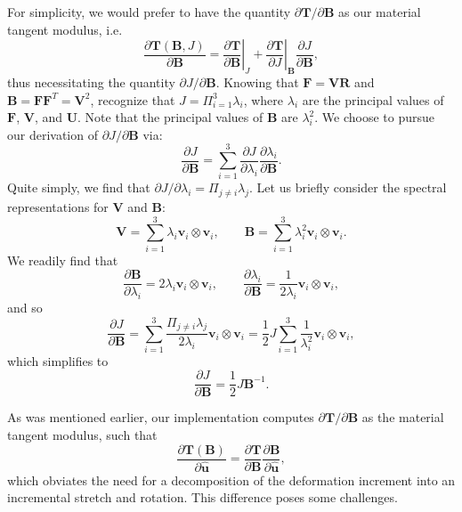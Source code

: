 \documentclass[11pt]{article} %
\begin{document}
For simplicity, we would prefer to have the quantity ${\partial \mathbf{T}}/{\partial {\mathbf{B}}}$ as our material tangent modulus, i.e.
\begin{equation}
	\frac{\partial \mathbf{T} (\mathbf{B}, J)}{\partial {\mathbf{B}}} = \left. \frac{\partial \mathbf{T}}{\partial {\mathbf{B}}} \right|_{J} + \left. \frac{\partial \mathbf{T}}{\partial {J}} \right|_{\mathbf{B}} \frac{\partial {J}}{\partial {\mathbf{B}}},
\end{equation}
thus necessitating the quantity ${\partial {J}}/{\partial {\mathbf{B}}}$. Knowing that $\mathbf{F} = \mathbf{V} \mathbf{R}$ and $\mathbf{B} = \mathbf{F} \mathbf{F}^T = \mathbf{V}^2$, recognize that $J = \Pi_{i = 1}^{3} \lambda_i$, where $\lambda_i$ are the principal values of $\mathbf{F}$, $\mathbf{V}$, and $\mathbf{U}$. Note that the principal values of $\mathbf{B}$ are $\lambda_i^2$. We choose to pursue our derivation of ${\partial {J}}/{\partial {\mathbf{B}}}$ via:
\begin{equation}
	\frac{\partial {J}}{\partial {\mathbf{B}}} = \sum_{i = 1}^{3} \frac{\partial {J}}{\partial \lambda_i} \frac{\partial \lambda_i}{\partial {\mathbf{B}}}.
\end{equation}
Quite simply, we find that $\partial J / \partial \lambda_i = \Pi_{j \neq i} \lambda_j$. Let us briefly consider the spectral representations for $\mathbf{V}$ and $\mathbf{B}$:
\begin{equation}
	\mathbf{V} = \sum_{i = 1}^{3} \lambda_i \mathbf{v}_i \otimes \mathbf{v}_i, \qquad \mathbf{B} = \sum_{i = 1}^{3} \lambda^2_i \mathbf{v}_i \otimes \mathbf{v}_i.
\end{equation}
We readily find that
\begin{equation}
	\frac{\partial \mathbf{B}}{\partial \lambda_i} = 2 \lambda_i \mathbf{v}_i \otimes \mathbf{v}_i, \qquad \frac{\partial \lambda_i}{\partial \mathbf{B}} = \frac{1}{2 \lambda_i} \mathbf{v}_i \otimes \mathbf{v}_i,
\end{equation}
and so
\begin{equation}
	\frac{\partial {J}}{\partial {\mathbf{B}}} = \sum_{i = 1}^{3} \frac{\Pi_{j \neq i} \lambda_j}{2 \lambda_i} \mathbf{v}_i \otimes \mathbf{v}_i = \frac{1}{2} J \sum_{i = 1}^{3} \frac{1}{\lambda^2_i} \mathbf{v}_i \otimes \mathbf{v}_i,
\end{equation}
which simplifies to
\begin{equation}
	\frac{\partial {J}}{\partial {\mathbf{B}}} = \frac{1}{2} J \mathbf{B}^{-1}.
\end{equation}

As was mentioned earlier, our implementation computes ${\partial \mathbf{T}}/{\partial {\mathbf{B}}}$ as the material tangent modulus, such that
\begin{equation}
	\frac{\partial \mathbf{T} (\mathbf{B})}{\partial \hat{\mathbf{u}}} = \frac{\partial \mathbf{T}}{\partial {\mathbf{B}}} \frac{\partial {\mathbf{B}}}{\partial \hat{\mathbf{u}}},
\end{equation}
which obviates the need for a decomposition of the deformation increment into an incremental stretch and rotation. This difference poses some challenges. 
\end{document}
